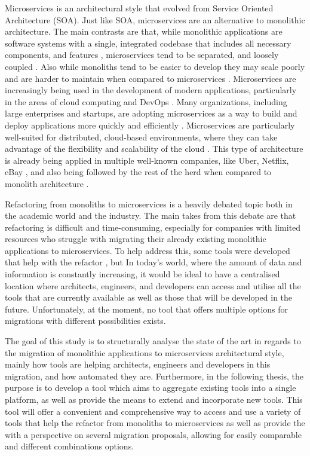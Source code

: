 \documentclass[conference]{IEEEtran}
\begin{document}
Microservices is an architectural style that evolved from Service Oriented
Architecture (SOA). Just like SOA, microservices are an alternative to
monolithic architecture. The main contrasts are that, while monolithic
applications are software systems with a single, integrated codebase that
includes all necessary components, and features
\cite{kazanavivcius2019migrating}, microservices tend to be separated, and
loosely coupled \cite{newman2021building}. Also while monoliths tend to be
easier to develop they may scale poorly and are harder to maintain when
compared to microservices \cite{newman2019monolith}. Microservices are
increasingly being used in the development of modern applications, particularly
in the areas of cloud computing and DevOps \cite{ren2018migrating}. Many
organizations, including large enterprises and startups, are adopting
microservices as a way to build and deploy applications more quickly and
efficiently \cite{richardson-microservices}. Microservices are particularly
well-suited for distributed, cloud-based environments, where they can take
advantage of the flexibility and scalability of the cloud
\cite{fowler-microservices-prerequisites}. This type of architecture is already
being applied in multiple well-known companies, like Uber, Netflix, eBay
\cite{microservices-users}, and also being followed by the rest of the herd
when compared to monolith architecture \cite{taibi2017processes}.

Refactoring from monoliths to microservices is a heavily debated topic both in
the academic world and the industry. The main takes from this debate are that
refactoring is difficult and time-consuming, especially for companies with
limited resources who struggle with migrating their already existing monolithic
applications to microservices. To help address this, some tools were developed
that help with the refactor , but In today's world, where the
amount of data and information is constantly increasing, it would be ideal to
have a centralised location where architects, engineers, and developers can
access and utilise all the tools that are currently available as well as those
that will be developed in the future. Unfortunately, at the moment, no tool
that offers multiple options for migrations with different possibilities
exists.

The goal of this study is to structurally analyse the state of the art in
regards to the migration of monolithic applications to microservices
architectural style, mainly how tools are helping architects, engineers and
developers in this migration, and how automated they are. Furthermore, in the
following thesis, the purpose is to develop a tool which aims to aggregate
existing tools into a single platform, as well as provide the means to extend
and incorporate new tools. This tool will offer a convenient and comprehensive
way to access and use a variety of tools that help the refactor from monoliths
to microservices as well as provide the with a perspective on several migration
proposals, allowing for easily comparable and different combinations options.
\end{document}
